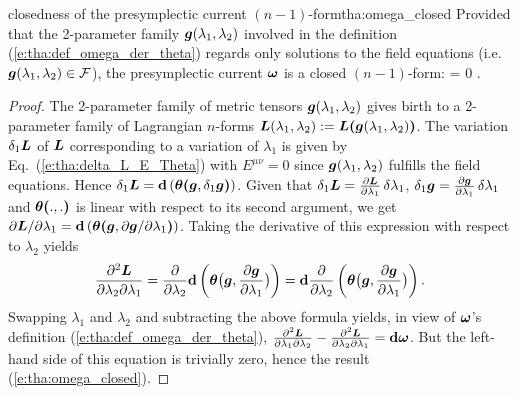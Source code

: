 \begin{tprop}{closedness of the presymplectic current $(n-1)$-form}{tha:omega_closed}
Provided that the 2-parameter family $\bm{g}(\lambda_1,\lambda_2)$
involved in the definition (\ref{e:tha:def_omega_der_theta}) regards
only solutions to the field equations (i.e. $\bm{g}(\lambda_1,\lambda_2) \in \mathcal{F}$),
the presymplectic current $\bm{\omega}$ is a closed $(n-1)$-form:
\be \label{e:tha:omega_closed}
    \dd \w{\omega} = 0 .
\ee
\end{tprop}

\begin{proof}
The 2-parameter family of metric tensors $\bm{g}(\lambda_1,\lambda_2)$ gives birth
to a 2-parameter family of Lagrangian $n$-forms
$\bm{L}(\lambda_1,\lambda_2) := \bm{L}\textbf{(}\bm{g}(\lambda_1,\lambda_2)\textbf{)}$.
The variation $\delta_1\bm{L}$ of $\bm{L}$ corresponding to a variation of $\lambda_1$ is
given by Eq.~(\ref{e:tha:delta_L_E_Theta}) with $E^{\mu\nu} = 0$ since
$\bm{g}(\lambda_1,\lambda_2)$ fulfills the field equations. Hence
$\delta_1 \bm{L} = \mathbf{d} \left( \bm{\theta}\textbf{(}\bm{g}, \delta_1 \bm{g}\textbf{)} \right)$.
Given that $\delta_1 \bm{L} = \frac{\partial \bm{L}}{\partial \lambda_1}  \, \delta \lambda_1$,
$\delta_1 \bm{g} = \frac{\partial \bm{g}}{\partial \lambda_1} \, \delta \lambda_1$
and $\bm{\theta}\textbf{(} .,.\textbf{)}$ is linear with respect to its second argument, we get
${\partial \bm{L}}/{\partial \lambda_1} = \mathbf{d} \left( \bm{\theta} \textbf{(}\bm{g},  {\partial \bm{g}}/{\partial \lambda_1} \textbf{)} \right)$.
Taking the derivative of this expression with respect to $\lambda_2$ yields
\[
    \frac{\partial^2\bm{L}}{\partial\lambda_2\partial\lambda_1} = \frac{\partial }{\partial \lambda_2}
        \mathbf{d} \left( \bm{\theta} \bm{\big(}\bm{g},  \frac{\partial \bm{g}}{\partial \lambda_1} \bm{\big)} \right)
        = \mathbf{d}  \frac{\partial }{\partial \lambda_2} \left( \bm{\theta} \bm{\big(}\bm{g},  \frac{\partial \bm{g}}{\partial \lambda_1} \bm{\big)} \right) .
\]
Swapping $\lambda_1$ and $\lambda_2$ and subtracting the above formula
yields, in view of $\bm{\omega}$'s definition (\ref{e:tha:def_omega_der_theta}),
$\frac{\partial^2\bm{L}}{\partial\lambda_1\partial\lambda_2} - \frac{\partial^2\bm{L}}{\partial\lambda_2\partial\lambda_1} = \mathbf{d}\bm{\omega}$. But the left-hand side of this equation
is trivially zero, hence the result (\ref{e:tha:omega_closed}).
\end{proof}


